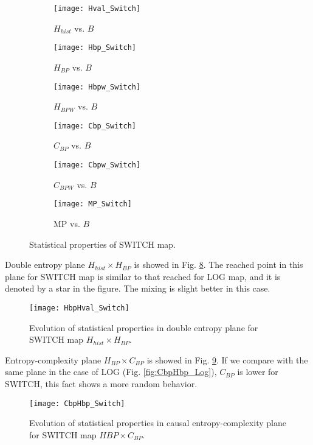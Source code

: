 \begin{figure}[H]
	\centering
	\begin{subfigure}[b]{0.49\textwidth}
		\texttt{[image: Hval\_Switch]}
		\caption{$H_{hist}$ vs. $B$}
		\label{fig:Hval_Switch}
	\end{subfigure}
	\begin{subfigure}[b]{0.49\textwidth}
		\texttt{[image: Hbp\_Switch]}
		\caption{$H_{BP}$ vs. $B$}
		\label{fig:Hbp_Switch}
	\end{subfigure}
	\begin{subfigure}[b]{0.49\textwidth}
		\texttt{[image: Hbpw\_Switch]}
		\caption{$H_{BPW}$ vs. $B$}
		\label{fig:Hbpw_Switch}
	\end{subfigure}
	\begin{subfigure}[b]{0.49\textwidth}
		\texttt{[image: Cbp\_Switch]}
		\caption{$C_{BP}$ vs. $B$}
		\label{fig:Cbp_Switch}
	\end{subfigure}
	\begin{subfigure}[b]{0.49\textwidth}
		\texttt{[image: Cbpw\_Switch]}
		\caption{$C_{BPW}$ vs. $B$}
		\label{fig:Cbpw_Switch}
	\end{subfigure}
	\begin{subfigure}[b]{0.49\textwidth}
		\texttt{[image: MP\_Switch]}
		\caption{MP vs. $B$}
		\label{fig:MP_Switch}
	\end{subfigure}
	\caption{Statistical properties of SWITCH map.}
	\label{fig:SWITCH_QuantiB}
\end{figure}

Double entropy plane $H_{hist} \times H_{BP}$ is showed in Fig. \ref{fig:SWITCH_HH}.
The reached point in this plane for SWITCH map is similar to that reached for LOG map, and it is denoted by a star in the figure.
The mixing is slight better in this case.

\begin{figure}[H]
	\centering
	\texttt{[image: HbpHval\_Switch]}
	\caption{Evolution of statistical properties in double entropy plane for SWITCH map $H_{hist} \times H_{BP}$.}
	\label{fig:SWITCH_HH}
\end{figure}

Entropy-complexity plane $H_{BP} \times C_{BP}$ is showed in Fig. \ref{fig:SWITCH_HC}.
If we compare with the same plane in the case of LOG (Fig. \ref{fig:CbpHbp_Log}), $C_{BP}$ is lower for SWITCH, this fact shows a more random behavior.

\begin{figure}[H]
	\centering
	\texttt{[image: CbpHbp\_Switch]}
	\caption{Evolution of statistical properties in causal entropy-complexity plane for SWITCH map $H{BP} \times C_{BP}$.}
	\label{fig:SWITCH_HC}
\end{figure}
